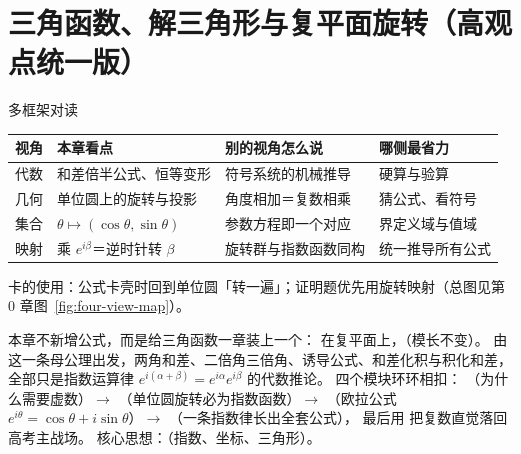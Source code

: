 
\section{三角函数、解三角形与复平面旋转（高观点统一版）}

\begin{methodbox}{多框架对读}
\small
\begin{center}
\begin{tabular}{c|p{2.9cm}|p{5.0cm}|p{3.1cm}}
\toprule
视角 & 本章看点 & 别的视角怎么说 & 哪侧最省力 \\
\midrule
代数 & 和差倍半公式、恒等变形 & 符号系统的机械推导 & 硬算与验算 \\
几何 & 单位圆上的旋转与投影 & 角度相加＝复数相乘 & 猜公式、看符号 \\
集合 & $\theta\mapsto(\cos\theta,\sin\theta)$ & 参数方程即一个对应 & 界定义域与值域 \\
映射 & 乘 $e^{i\beta}$＝逆时针转 $\beta$ & 旋转群与指数函数同构 & 统一推导所有公式 \\
\bottomrule
\end{tabular}
\end{center}
卡的使用：公式卡壳时回到单位圆「转一遍」；证明题优先用旋转映射（总图见第 0 章图~\ref{fig:four-view-map}）。
\end{methodbox}

本章不新增公式，而是给三角函数一章装上一个：
在复平面上，（模长不变）。
由这一条母公理出发，两角和差、二倍角三倍角、诱导公式、和差化积与积化和差，
全部只是指数运算律 $e^{i(\alpha+\beta)}=e^{i\alpha}e^{i\beta}$ 的代数推论。
四个模块环环相扣：
（为什么需要虚数）$\to$
（单位圆旋转必为指数函数）$\to$
（欧拉公式 $e^{i\theta}=\cos\theta+i\sin\theta$）$\to$
（一条指数律长出全套公式），
最后用  把复数直觉落回高考主战场。
核心思想：（指数、坐标、三角形）。

